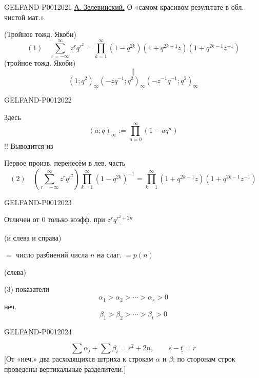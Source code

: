\begin{GelfandAdjacentEvidence}{GELFAND-P001202}{1}
\underline{А. Зелевинский.} О «самом красивом результате в обл. чистой мат.»

(Тройное тожд. Якоби)
\[
(1)\quad
\sum_{r=-\infty}^{\infty}z^r q^{r^2}
=\prod_{k=1}^{\infty}(1-q^{2k})(1+q^{2k-1}z)(1+q^{2k-1}z^{-1})
\]
(тройное тожд. Якоби)
\[
\Vert
\]
\[
(1;q^2)_\infty(-zq^{-1};q^2)_\infty(-z^{-1}q^{-1};q^2)_\infty
\]
\end{GelfandAdjacentEvidence}
\begin{GelfandAdjacentEvidence}{GELFAND-P001202}{2}


Здесь
\[
(a;q)_\infty:=\prod_{n=0}^{\infty}(1-aq^n)
\]
!! Выводится из 


Первое произв. перенесём в лев. часть
\[
(2)\quad
\left(\sum_{r=-\infty}^{\infty}z^r q^{r^2}\right)
\prod_{k=1}^{\infty}(1-q^{2k})^{-1}
=\prod_{k=1}^{\infty}(1+q^{2k-1}z)(1+q^{2k-1}z^{-1})
\]
\end{GelfandAdjacentEvidence}
\begin{GelfandAdjacentEvidence}{GELFAND-P001202}{3}


Отличен от $0$ только коэфф. при $\underline{z^r q^{r^2+2n}}$

(и слева и справа)

$={}$ число разбиений числа $n$ на слаг. $=p(n)$

(слева)

(3)  показатели
\[
\alpha_1>\alpha_2>\cdots>\alpha_s>0
\]
неч.
\[
\beta_1>\beta_2>\cdots>\beta_t>0
\]
\end{GelfandAdjacentEvidence}
\begin{GelfandAdjacentEvidence}{GELFAND-P001202}{4}

\[
\sum\alpha_j+\sum\beta_i=r^2+2n,\qquad \underline{\underline{s-t=r}}
\]
[От «неч.» два расходящихся штриха к строкам $\alpha$ и $\beta$; по сторонам строк проведены вертикальные разделители.]

\end{GelfandAdjacentEvidence}
